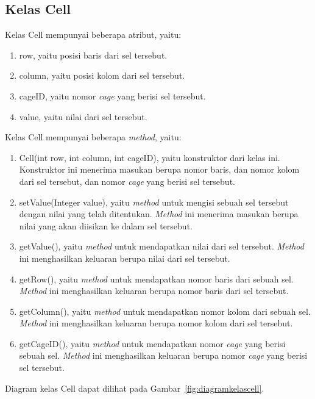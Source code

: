 \subsection{Kelas Cell}
\label{sec:kelascell}

Kelas Cell mempunyai beberapa atribut, yaitu:

\begin{enumerate}
\item row, yaitu posisi baris dari sel tersebut.
\item column, yaitu posisi kolom dari sel tersebut.
\item cageID, yaitu nomor \textit{cage} yang berisi sel tersebut.
\item value, yaitu nilai dari sel tersebut.
\end{enumerate}

\clearpage

Kelas Cell mempunyai beberapa \textit{method}, yaitu:

\begin{enumerate}
\item Cell(int row, int column, int cageID), yaitu konstruktor dari kelas ini. Konstruktor ini menerima masukan berupa nomor baris, dan nomor kolom dari sel tersebut, dan nomor \textit{cage} yang berisi sel tersebut.
\item setValue(Integer value), yaitu \textit{method} untuk mengisi sebuah sel tersebut dengan nilai yang telah ditentukan. \textit{Method} ini menerima masukan berupa nilai yang akan diisikan ke dalam sel tersebut.
\item getValue(), yaitu \textit{method} untuk mendapatkan nilai dari sel tersebut. \textit{Method} ini menghasilkan keluaran berupa nilai dari sel tersebut.
\item getRow(), yaitu \textit{method} untuk mendapatkan nomor baris dari sebuah sel. \textit{Method} ini menghasilkan keluaran berupa nomor baris dari sel tersebut.
\item getColumn(), yaitu \textit{method} untuk mendapatkan nomor kolom dari sebuah sel. \textit{Method} ini menghasilkan keluaran berupa nomor kolom dari sel tersebut.
\item getCageID(), yaitu \textit{method} untuk mendapatkan nomor \textit{cage} yang berisi sebuah sel. \textit{Method} ini menghasilkan keluaran berupa nomor \textit{cage} yang berisi sel tersebut.
\end{enumerate}

Diagram kelas Cell dapat dilihat pada Gambar~\ref{fig:diagramkelascell}.

